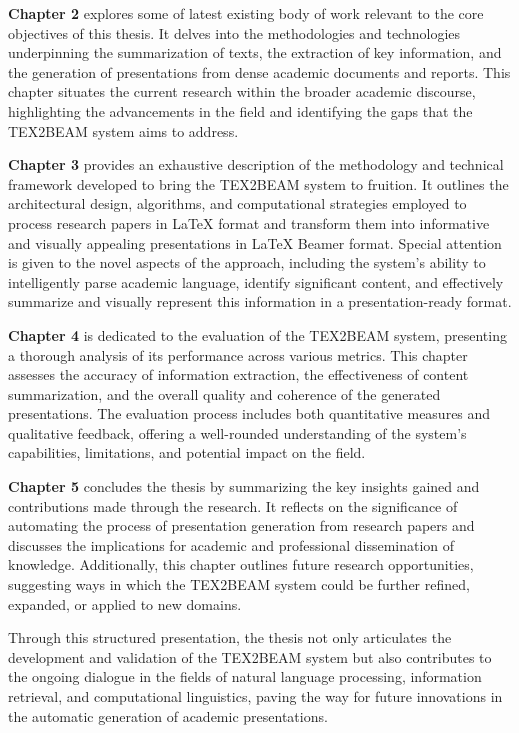 \textbf{Chapter 2} explores some of latest existing body of work relevant to the core objectives of this thesis. It delves into the methodologies and technologies underpinning the summarization of texts, the extraction of key information, and the generation of presentations from dense academic documents and reports. This chapter situates the current research within the broader academic discourse, highlighting the advancements in the field and identifying the gaps that the TEX2BEAM system aims to address.

\textbf{Chapter 3} provides an exhaustive description of the methodology and technical framework developed to bring the TEX2BEAM system to fruition. It outlines the architectural design, algorithms, and computational strategies employed to process research papers in \LaTeX{} format and transform them into informative and visually appealing presentations in \LaTeX{} Beamer format. Special attention is given to the novel aspects of the approach, including the system's ability to intelligently parse academic language, identify significant content, and effectively summarize and visually represent this information in a presentation-ready format.

\textbf{Chapter 4} is dedicated to the evaluation of the TEX2BEAM system, presenting a thorough analysis of its performance across various metrics. This chapter assesses the accuracy of information extraction, the effectiveness of content summarization, and the overall quality and coherence of the generated presentations. The evaluation process includes both quantitative measures and qualitative feedback, offering a well-rounded understanding of the system's capabilities, limitations, and potential impact on the field.

\textbf{Chapter 5} concludes the thesis by summarizing the key insights gained and contributions made through the research. It reflects on the significance of automating the process of presentation generation from research papers and discusses the implications for academic and professional dissemination of knowledge. Additionally, this chapter outlines future research opportunities, suggesting ways in which the TEX2BEAM system could be further refined, expanded, or applied to new domains.

Through this structured presentation, the thesis not only articulates the development and validation of the TEX2BEAM system but also contributes to the ongoing dialogue in the fields of natural language processing, information retrieval, and computational linguistics, paving the way for future innovations in the automatic generation of academic presentations.